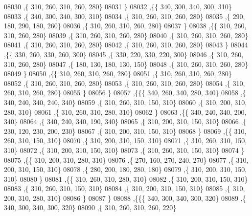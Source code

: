 \begin{DoxyCode}
08030     ,\{   310,   260,   310,   260,   280\}
08031     \}
08032    ,\{\{   340,   300,   340,   300,   310\}
08033     ,\{   340,   300,   340,   300,   310\}
08034     ,\{   310,   260,   310,   260,   280\}
08035     ,\{   290,   180,   290,   180,   260\}
08036     ,\{   310,   260,   310,   260,   280\}
08037     \}
08038    ,\{\{   310,   260,   310,   260,   280\}
08039     ,\{   310,   260,   310,   260,   280\}
08040     ,\{   310,   260,   310,   260,   280\}
08041     ,\{   310,   260,   310,   260,   280\}
08042     ,\{   310,   260,   310,   260,   280\}
08043     \}
08044    ,\{\{   330,   260,   330,   260,   300\}
08045     ,\{   330,   220,   330,   220,   300\}
08046     ,\{   310,   260,   310,   260,   280\}
08047     ,\{   180,   130,   180,   130,   150\}
08048     ,\{   310,   260,   310,   260,   280\}
08049     \}
08050    ,\{\{   310,   260,   310,   260,   280\}
08051     ,\{   310,   260,   310,   260,   280\}
08052     ,\{   310,   260,   310,   260,   280\}
08053     ,\{   310,   260,   310,   260,   280\}
08054     ,\{   310,   260,   310,   260,   280\}
08055     \}
08056    \}
08057   ,\{\{\{   340,   260,   340,   280,   340\}
08058     ,\{   340,   240,   340,   240,   340\}
08059     ,\{   310,   260,   310,   150,   310\}
08060     ,\{   310,   200,   310,   280,   310\}
08061     ,\{   310,   260,   310,   280,   310\}
08062     \}
08063    ,\{\{   340,   240,   340,   200,   340\}
08064     ,\{   340,   240,   340,   190,   340\}
08065     ,\{   310,   200,   310,   150,   310\}
08066     ,\{   230,   120,   230,   200,   230\}
08067     ,\{   310,   200,   310,   150,   310\}
08068     \}
08069    ,\{\{   310,   260,   310,   150,   310\}
08070     ,\{   310,   200,   310,   150,   310\}
08071     ,\{   310,   260,   310,   150,   310\}
08072     ,\{   310,   200,   310,   150,   310\}
08073     ,\{   310,   260,   310,   150,   310\}
08074     \}
08075    ,\{\{   310,   200,   310,   280,   310\}
08076     ,\{   270,   160,   270,   240,   270\}
08077     ,\{   310,   200,   310,   150,   310\}
08078     ,\{   280,   200,   180,   280,   180\}
08079     ,\{   310,   200,   310,   150,   310\}
08080     \}
08081    ,\{\{   310,   260,   310,   280,   310\}
08082     ,\{   310,   200,   310,   150,   310\}
08083     ,\{   310,   260,   310,   150,   310\}
08084     ,\{   310,   200,   310,   150,   310\}
08085     ,\{   310,   200,   310,   280,   310\}
08086     \}
08087    \}
08088   ,\{\{\{   340,   300,   340,   300,   320\}
08089     ,\{   340,   300,   340,   300,   320\}
08090     ,\{   310,   260,   310,   260,   220\}

\end{DoxyCode}

